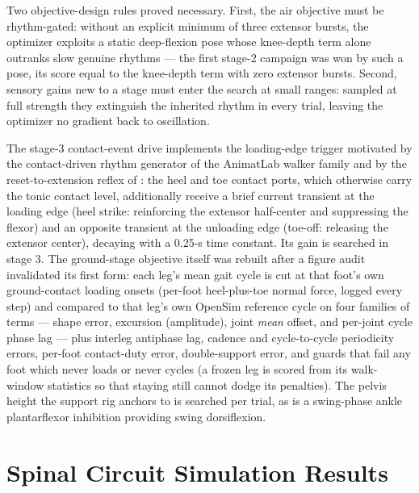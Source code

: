 Two objective-design rules proved necessary. First, the air objective
must be rhythm-gated: without an explicit minimum of three extensor
bursts, the optimizer exploits a static deep-flexion pose whose
knee-depth term alone outranks slow genuine rhythms --- the first
stage-2 campaign was won by such a pose, its score equal to the
knee-depth term with zero extensor bursts. Second, sensory gains new
to a stage must enter the search at small ranges: sampled at full
strength they extinguish the inherited rhythm in every trial, leaving
the optimizer no gradient back to oscillation.

The stage-3 contact-event drive implements the loading-edge trigger
motivated by the contact-driven rhythm generator of the AnimatLab
walker family and by the reset-to-extension reflex of
\citet{conway1987}: the heel and toe contact ports, which otherwise
carry the tonic contact level, additionally receive a brief current
transient at the loading edge (heel strike: reinforcing the extensor
half-center and suppressing the flexor) and an opposite transient at
the unloading edge (toe-off: releasing the extensor center), decaying
with a 0.25-s time constant. Its gain is searched in stage 3.
The ground-stage objective itself was rebuilt after a figure audit
invalidated its first form: each leg's mean gait cycle is cut at that
foot's own ground-contact loading onsets (per-foot heel-plus-toe
normal force, logged every step) and compared to that leg's own
OpenSim reference cycle on four families of terms — shape error,
excursion (amplitude), joint \emph{mean} offset, and per-joint cycle
phase lag — plus interleg antiphase lag, cadence and cycle-to-cycle
periodicity errors, per-foot contact-duty error, double-support
error, and guards that fail any foot which never loads or never
cycles (a frozen leg is scored from its walk-window statistics so
that staying still cannot dodge its penalties). The pelvis height the
support rig anchors to is searched per trial, as is a swing-phase
ankle plantarflexor inhibition providing swing dorsiflexion.


\section{Spinal Circuit Simulation Results}
\label{sec:results-cpg}

